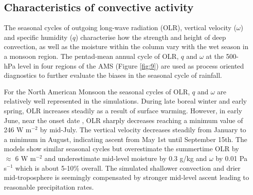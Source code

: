 
\subsection{Characteristics of convective activity}

The seasonal cycles of outgoing long-wave radiation (OLR), vertical velocity ($\omega$) and specific humidity ($q$) characterise how the strength and height of deep convection, as well as the moisture within the column vary with the wet season in a monsoon region.
 The pentad-mean annual cycle of OLR, $q$ and $\omega$ at the 500-hPa level in four regions of the AMS (Figure \ref{fig:9}) are used as process oriented diagnostics to further evaluate the biases in the seasonal cycle of rainfall.
 
For the North American Monsoon the seasonal cycles of OLR, $q$ and $\omega$ are relatively well represented in the simulations.
During late boreal winter and early spring, OLR increases steadily as a result of surface warming.
However, in early June, near the onset date \citep{douglas1993,geil2013}, OLR sharply decreases reaching a minimum value of 246 W m$^{-2}$ by mid-July.
The vertical velocity decreases steadily from January to a minimum in August, indicating ascent from May 1st until September 15th.
 The models show similar seasonal cycles but overestimate the summertime OLR by $\approx$ 6 W m$^{-2}$ and underestimate mid-level moisture by 0.3 g/kg and $\omega$ by 0.01 Pa s$^{-1}$ which is about 5-10\% overall. 
The simulated shallower convection and drier mid-troposphere is seemingly compensated by stronger mid-level ascent leading to reasonable precipitation rates.


